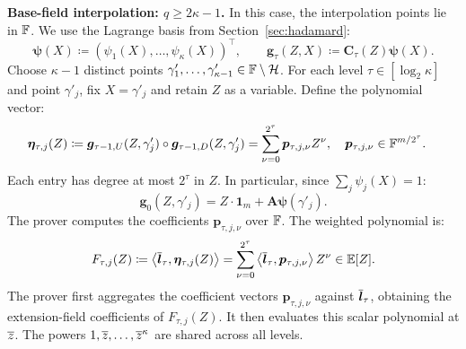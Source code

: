 \smallskip\noindent\textbf{Base-field interpolation: \(q\geq2\kappa-1\).}
In this case, the interpolation points lie in \({\mathbb{F}}\).
We use the Lagrange basis from Section~\ref{sec:hadamard}:
\[
    \bm\psi(X)\coloneqq
       (\psi_1(X),\ldots,\psi_\kappa(X))^\top,
    \qquad
    \bm g_\tau(Z,X)\coloneqq\bm C_\tau(Z)\bm\psi(X).
\]
Choose \(\kappa-1\) distinct points
\(\gamma'_1,\ldots,\gamma'_{\kappa-1}\in
{\mathbb{F}}\setminus\mathcal H\).
For each level \(\tau\in [\log_2\kappa]\) and point
\(\gamma'_j\), fix \(X=\gamma'_j\) and retain \(Z\) as a
variable. Define the polynomial vector:
\[
\begin{aligned}
    \bm\eta_{\tau,j}(Z)
      &\coloneqq
      \bm g_{\tau-1,U}(Z,\gamma'_j)
      \circ\bm g_{\tau-1,D}(Z,\gamma'_j)
      =\sum_{\nu=0}^{2^\tau}\bm p_{\tau,j,\nu}Z^\nu,
    \quad
    \bm p_{\tau,j,\nu}\in{\mathbb{F}}^{m/2^\tau}.
\end{aligned}
\]
Each entry has degree at most \(2^\tau\) in \(Z\).
In particular, since \(\sum_j\psi_j(X)=1\):
\[
    \bm g_0(Z,\gamma'_j)
       =Z \cdot \bm1_m+\bm A\bm\psi(\gamma'_j).
\]
The prover computes the coefficients
\(\bm p_{\tau,j,\nu}\) over \({\mathbb{F}}\). The weighted
polynomial is:
\[
    F_{\tau,j}(Z)
       \coloneqq\left\langle\overline{\bm l}_\tau,
                             \bm\eta_{\tau,j}(Z)\right\rangle
       =\sum_{\nu=0}^{2^\tau}
          \left\langle\overline{\bm l}_\tau,
                       \bm p_{\tau,j,\nu}\right\rangle Z^\nu
       \in\mathbb{E}[Z].
\]
The prover first aggregates the coefficient vectors
\(\bm p_{\tau,j,\nu}\) against \(\overline{\bm l}_\tau\), obtaining
the extension-field coefficients of \(F_{\tau,j}(Z)\).
It then evaluates this scalar polynomial at \(\overline{z}\).
The powers \(1,\overline{z},\ldots,\overline{z}^\kappa\) are shared across
all levels.

